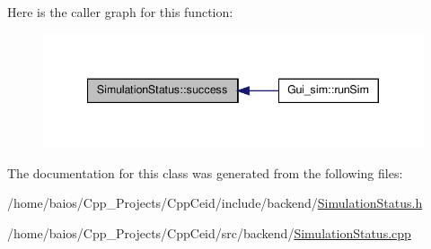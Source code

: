 Here is the caller graph for this function\-:\nopagebreak
\begin{figure}[H]
\begin{center}
\leavevmode
\includegraphics[width=340pt]{class_simulation_status_a536b34bf815fc21ac19e47b3505f4fd8_icgraph}
\end{center}
\end{figure}




The documentation for this class was generated from the following files\-:\begin{DoxyCompactItemize}
\item 
/home/baios/\-Cpp\-\_\-\-Projects/\-Cpp\-Ceid/include/backend/\hyperlink{_simulation_status_8h}{Simulation\-Status.\-h}\item 
/home/baios/\-Cpp\-\_\-\-Projects/\-Cpp\-Ceid/src/backend/\hyperlink{_simulation_status_8cpp}{Simulation\-Status.\-cpp}\end{DoxyCompactItemize}

